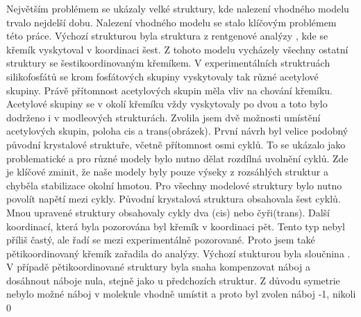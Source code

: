 \documentclass[
  digital, %
  table,   %
  lof,     %
  lot,     %
  oneside,
]{fithesis3}
\begin{document}
Největším problémem se ukázaly velké struktury, kde nalezení vhodného modelu trvalo nejdelší dobu. Nalezení vhodného modelu se stalo klíčovým problémem této práce.  Výchozí strukturou byla struktura z rentgenové analýzy \cite{C3NJ00721A}, kde se křemík vyskytoval v koordinaci šest. Z tohoto modelu vycházely všechny ostatní struktury se šestikoordinovaným křemíkem. V experimentálních struktruách silikofosfátů se krom fosfátových skupiny vyskytovaly tak různé acetylové skupiny. Právě přítomnost acetylových skupin měla vliv na chování křemíku. Acetylové skupiny  se v okolí křemíku vždy vyskytovaly po dvou a toto bylo dodrženo i v modleových strukturách. Zvolila jsem dvě možnosti umístění acetylových skupin, poloha cis a trans(obrázek). První návrh byl velice podobný původní krystalové struktuře, včetně přítomnost osmi cyklů. To se ukázalo jako problematické a pro různé modely bylo nutno dělat rozdílná uvolnění cyklů. Zde je klíčové zminit, že naše modely byly pouze výseky z rozsáhlých struktur a chyběla stabilizace okolní hmotou. Pro všechny modelové struktury bylo nutno povolít napětí mezi cykly. Původní krystalová struktura obsahovala šest cyklů. Mnou upravené struktury obsahovaly cykly dva (cis) nebo čyři(trans). Další koordinací, která byla pozorována byl křemík v koordinaci pět. Tento typ nebyl příliš častý, ale řadí se mezi experimentálně pozorované. Proto jsem také pětikoordinovaný křemík zařadila do analýzy. Výchozí stukturou byla sloučnina \cite{rtg_5}. V případě pětikoordinované struktury byla snaha kompenzovat náboj a dosáhnout náboje nula, stejně jako u předchozích struktur. Z důvodu symetrie nebylo možné náboj v molekule vhodně umístit a proto byl zvolen náboj -1, nikoli 0
\end{document}
